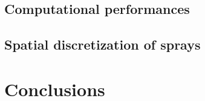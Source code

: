 \subsection{Computational performances}
\label{subsubsec:ch5_computational_performances}


\subsection{Spatial discretization of sprays}

\section{Conclusions}

